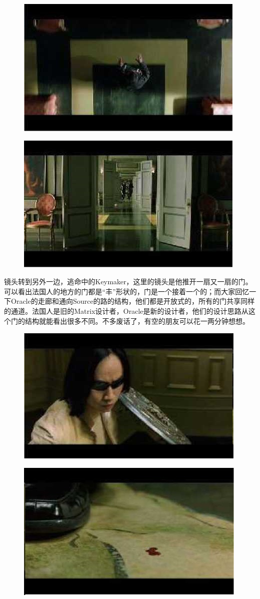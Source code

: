\documentclass[UTF8]{ctexart}
\begin{document}
\begin{figure}[htb]
\centering
\includegraphics[width=0.5\linewidth]{fig/read_reloaded-122}
\end{figure}

\begin{figure}[!htb]
\centering
\includegraphics[width=0.5\linewidth]{fig/read_reloaded-122-1}
\end{figure}

镜头转到另外一边，逃命中的Keymaker，这里的镜头是他推开一扇又一扇的门。可以看出法国人的地方的门都是“丰”形状的，门是一个接着一个的；而大家回忆一下Oracle的走廊和通向Source的路的结构，他们都是开放式的，所有的门共享同样的通道。法国人是旧的Matrix设计者，Oracle是新的设计者，他们的设计思路从这个门的结构就能看出很多不同。不多废话了，有空的朋友可以花一两分钟想想。

\begin{figure}[htb]
\centering
\includegraphics[width=0.5\linewidth]{fig/read_reloaded-123}
\end{figure}

\begin{figure}[htb]
\centering
\includegraphics[width=0.5\linewidth]{fig/read_reloaded-123-1}
\end{figure}
\end{document}
